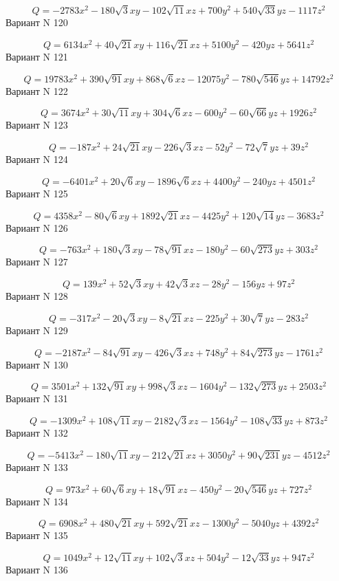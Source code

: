 \documentclass[11pt]{report}
\begin{document}
$$Q = - 2783 x^{2} - 180 \sqrt{3} x y - 102 \sqrt{11} x z + 700 y^{2} + 540 \sqrt{33} y z - 1117 z^{2}$$Вариант N 120

$$Q = 6134 x^{2} + 40 \sqrt{21} x y + 116 \sqrt{21} x z + 5100 y^{2} - 420 y z + 5641 z^{2}$$Вариант N 121

$$Q = 19783 x^{2} + 390 \sqrt{91} x y + 868 \sqrt{6} x z - 12075 y^{2} - 780 \sqrt{546} y z + 14792 z^{2}$$Вариант N 122

$$Q = 3674 x^{2} + 30 \sqrt{11} x y + 304 \sqrt{6} x z - 600 y^{2} - 60 \sqrt{66} y z + 1926 z^{2}$$Вариант N 123

$$Q = - 187 x^{2} + 24 \sqrt{21} x y - 226 \sqrt{3} x z - 52 y^{2} - 72 \sqrt{7} y z + 39 z^{2}$$Вариант N 124

$$Q = - 6401 x^{2} + 20 \sqrt{6} x y - 1896 \sqrt{6} x z + 4400 y^{2} - 240 y z + 4501 z^{2}$$Вариант N 125

$$Q = 4358 x^{2} - 80 \sqrt{6} x y + 1892 \sqrt{21} x z - 4425 y^{2} + 120 \sqrt{14} y z - 3683 z^{2}$$Вариант N 126

$$Q = - 763 x^{2} + 180 \sqrt{3} x y - 78 \sqrt{91} x z - 180 y^{2} - 60 \sqrt{273} y z + 303 z^{2}$$Вариант N 127

$$Q = 139 x^{2} + 52 \sqrt{3} x y + 42 \sqrt{3} x z - 28 y^{2} - 156 y z + 97 z^{2}$$Вариант N 128

$$Q = - 317 x^{2} - 20 \sqrt{3} x y - 8 \sqrt{21} x z - 225 y^{2} + 30 \sqrt{7} y z - 283 z^{2}$$Вариант N 129

$$Q = - 2187 x^{2} - 84 \sqrt{91} x y - 426 \sqrt{3} x z + 748 y^{2} + 84 \sqrt{273} y z - 1761 z^{2}$$Вариант N 130

$$Q = 3501 x^{2} + 132 \sqrt{91} x y + 998 \sqrt{3} x z - 1604 y^{2} - 132 \sqrt{273} y z + 2503 z^{2}$$Вариант N 131

$$Q = - 1309 x^{2} + 108 \sqrt{11} x y - 2182 \sqrt{3} x z - 1564 y^{2} - 108 \sqrt{33} y z + 873 z^{2}$$Вариант N 132

$$Q = - 5413 x^{2} - 180 \sqrt{11} x y - 212 \sqrt{21} x z + 3050 y^{2} + 90 \sqrt{231} y z - 4512 z^{2}$$Вариант N 133

$$Q = 973 x^{2} + 60 \sqrt{6} x y + 18 \sqrt{91} x z - 450 y^{2} - 20 \sqrt{546} y z + 727 z^{2}$$Вариант N 134

$$Q = 6908 x^{2} + 480 \sqrt{21} x y + 592 \sqrt{21} x z - 1300 y^{2} - 5040 y z + 4392 z^{2}$$Вариант N 135

$$Q = 1049 x^{2} + 12 \sqrt{11} x y + 102 \sqrt{3} x z + 504 y^{2} - 12 \sqrt{33} y z + 947 z^{2}$$Вариант N 136
\end{document}
